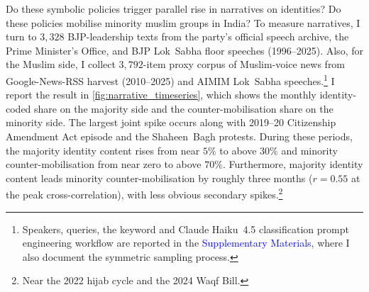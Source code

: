 \documentclass[11pt,twoside]{extarticle}
\newcommand{\suppmat}{\textcolor{blue}{Supplementary Materials}}
\begin{document}

Do these symbolic policies trigger parallel rise in narratives on identities? Do these policies mobilise minority muslim groups in India? To measure narratives, I turn to $3{,}328$ BJP-leadership texts from the party's official speech archive, the Prime Minister's Office, and BJP Lok~Sabha floor speeches (1996--2025). 
Also, for the Muslim side, I collect $3{,}792$-item proxy corpus of Muslim-voice news from Google-News-RSS harvest (2010--2025) and AIMIM Lok~Sabha speeches.\footnote{Speakers, queries, the keyword and Claude Haiku~4.5 classification prompt engineering workflow are reported in the \suppmat, where I also document the symmetric sampling process.} I report the result in \autoref{fig:narrative_timeseries}, which shows the monthly identity-coded share on the majority side and the counter-mobilisation share on the minority side.
The largest joint spike occurs along with 2019--20 Citizenship Amendment Act episode and the Shaheen~Bagh protests. During these periods, the majority identity content rises from near $5\%$ to above $30\%$ and minority counter-mobilisation from near zero to above $70\%$. 
Furthermore, majority identity content leads minority counter-mobilisation by roughly three months ($r=0.55$ at the peak cross-correlation), with less obvious secondary spikes.\footnote{Near the 2022 hijab cycle and the 2024 Waqf Bill.}
\end{document}
